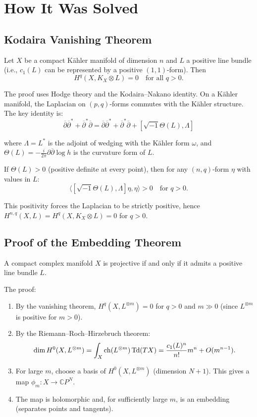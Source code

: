 \section{How It Was Solved}

\subsection{Kodaira Vanishing Theorem}

\begin{theorem}
Let $X$ be a compact K\"{a}hler manifold of dimension $n$ and $L$ a positive line bundle (i.e., $c_1(L)$ can be represented by a positive $(1,1)$-form). Then
\[
H^q(X, K_X \otimes L) = 0 \quad \text{for all } q > 0.
\]
\end{theorem}

The proof uses Hodge theory and the Kodaira--Nakano identity. On a K\"{a}hler manifold, the Laplacian on $(p,q)$-forms commutes with the K\"{a}hler structure. The key identity is:
\[
\overline{\partial} \overline{\partial}^* + \overline{\partial}^* \overline{\partial} = \overline{\partial} \overline{\partial}^* + \overline{\partial}^* \overline{\partial} + [\sqrt{-1}\Theta(L), \Lambda]
\]

where $\Lambda = L^*$ is the adjoint of wedging with the K\"{a}hler form $\omega$, and $\Theta(L) = -\frac{i}{2\pi} \partial \overline{\partial} \log h$ is the curvature form of $L$.

If $\Theta(L) > 0$ (positive definite at every point), then for any $(n,q)$-form $\eta$ with values in $L$:
\[
\langle [\sqrt{-1}\Theta(L), \Lambda] \eta, \eta \rangle > 0 \quad \text{for } q > 0.
\]

This positivity forces the Laplacian to be strictly positive, hence $H^{n,q}(X, L) = H^q(X, K_X \otimes L) = 0$ for $q > 0$.

\subsection{Proof of the Embedding Theorem}

\begin{theorem}
A compact complex manifold $X$ is projective if and only if it admits a positive line bundle $L$.
\end{theorem}

The proof:
\begin{enumerate}
    \item By the vanishing theorem, $H^q(X, L^{\otimes m}) = 0$ for $q > 0$ and $m \gg 0$ (since $L^{\otimes m}$ is positive for $m>0$).
    \item By the Riemann--Roch--Hirzebruch theorem:
    \[
    \dim H^0(X, L^{\otimes m}) = \int_X \operatorname{ch}(L^{\otimes m}) \operatorname{Td}(TX) = \frac{c_1(L)^n}{n!} m^n + O(m^{n-1}).
    \]
    \item For large $m$, choose a basis of $H^0(X, L^{\otimes m})$ (dimension $N+1$). This gives a map $\phi_m: X \to \mathbb{C}P^N$.
    \item The map is holomorphic and, for sufficiently large $m$, is an embedding (separates points and tangents).
\end{enumerate}

